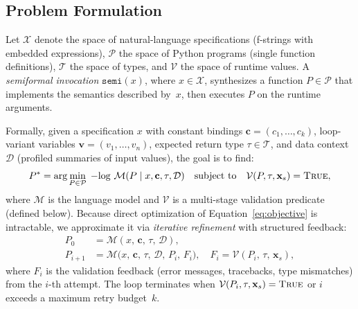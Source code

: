 %
%



\subsection{Problem Formulation}
\label{sec:problem-formulation}

Let $\mathcal{X}$ denote the space of natural-language specifications (f-strings
with embedded expressions), $\mathcal{P}$ the space of Python programs (single
function definitions), $\mathcal{T}$ the space of types, and $\mathcal{V}$ the
space of runtime values.  A \emph{semiformal invocation}
$\texttt{semi}(x)$, where $x \in \mathcal{X}$, synthesizes a function
$P \in \mathcal{P}$ that implements the semantics described by~$x$, then
executes $P$ on the runtime arguments.

Formally, given a specification $x$ with constant bindings
$\mathbf{c} = (c_1, \dots, c_k)$, loop-variant variables
$\mathbf{v} = (v_1, \dots, v_n)$, expected return type $\tau \in \mathcal{T}$,
and data context~$\mathcal{D}$ (profiled summaries of input values), the goal
is to find:
\begin{equation}
\label{eq:objective}
P^{*} = \arg\min_{P \in \mathcal{P}} \; -\!\log\, \mathcal{M}(P \mid x, \mathbf{c}, \tau, \mathcal{D})
\quad \text{subject to} \quad
\mathcal{V}(P, \tau, \mathbf{x}_s) = \textsc{True},
\end{equation}
where $\mathcal{M}$ is the language model and $\mathcal{V}$ is a multi-stage
validation predicate (defined below).  Because direct optimization of
Equation~\eqref{eq:objective} is intractable, we approximate it via
\emph{iterative refinement} with structured feedback:
\begin{align}
P_0 &= \mathcal{M}(x,\, \mathbf{c},\, \tau,\, \mathcal{D}), \label{eq:init}\\
P_{i+1} &= \mathcal{M}\!\bigl(x,\, \mathbf{c},\, \tau,\, \mathcal{D},\, P_i,\, F_i\bigr),
\quad F_i = \mathcal{V}(P_i,\, \tau,\, \mathbf{x}_s), \label{eq:refine}
\end{align}
where $F_i$ is the validation feedback (error messages, tracebacks, type
mismatches) from the $i$-th attempt.  The loop terminates when
$\mathcal{V}(P_i, \tau, \mathbf{x}_s) = \textsc{True}$ or $i$ exceeds a
maximum retry budget~$k$.

